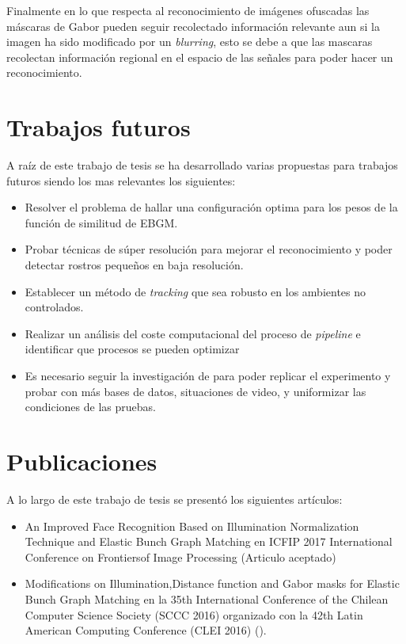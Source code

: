 Finalmente en lo que respecta al reconocimiento de imágenes ofuscadas las máscaras de Gabor pueden seguir recolectado información relevante aun si la imagen ha sido modificado por un \textit{blurring}, esto se debe a que las mascaras recolectan información regional en el espacio de las señales para poder hacer un reconocimiento.

\section{Trabajos futuros}
A raíz de este trabajo de tesis se ha desarrollado varias propuestas para trabajos futuros siendo los mas relevantes los siguientes:
\begin{itemize}
\item Resolver el problema de hallar una configuración optima para los pesos de la función de similitud de \ac{EBGM}.
\item Probar técnicas de súper resolución para mejorar el reconocimiento y poder detectar rostros pequeños en baja resolución.
\item Establecer un método de \textit{tracking} que sea robusto en los ambientes no controlados.
\item Realizar un análisis del coste computacional del proceso de \textit{pipeline} e identificar que procesos se pueden optimizar
\item Es necesario seguir la investigación de \cite{mcpherson2016defeating} para poder replicar el experimento y probar con más bases de datos, situaciones de video, y uniformizar las condiciones de las pruebas.
\end{itemize}

\section{Publicaciones}
A lo largo de este trabajo de tesis se presentó los siguientes artículos:
\begin{itemize}
\item An Improved Face Recognition Based on Illumination Normalization Technique and Elastic Bunch Graph Matching en ICFIP 2017 International Conference on Frontiersof Image Processing (Articulo aceptado)
\item Modifications on Illumination,Distance function and Gabor masks for Elastic Bunch Graph Matching en la 35th International Conference of the Chilean Computer Science Society (SCCC 2016) organizado con la 42th Latin American Computing Conference (CLEI 2016) (\cite{caceres2016modifications}).
\end{itemize}

